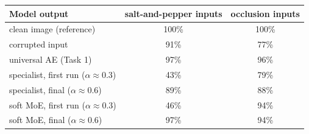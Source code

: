 \begin{tabular}{lcc}
\toprule
Model output & salt-and-pepper inputs & occlusion inputs \\
\midrule
clean image (reference) & 100\% & 100\% \\
corrupted input & 91\% & 77\% \\
universal AE (Task 1) & 97\% & 96\% \\
specialist, first run ($\alpha\approx0.3$) & 43\% & 79\% \\
specialist, final ($\alpha\approx0.6$) & 89\% & 88\% \\
soft MoE, first run ($\alpha\approx0.3$) & 46\% & 94\% \\
soft MoE, final ($\alpha\approx0.6$) & 97\% & 94\% \\
\bottomrule
\end{tabular}
